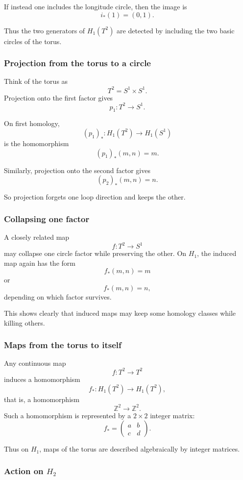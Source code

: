 \documentclass[12pt,a4paper]{article}
\theoremstyle{notespace}
\begin{document}
If instead one includes the longitude circle, then the image is
\[
i_*(1)=(0,1).
\]

Thus the two generators of \(H_1(T^2)\) are detected by including the two basic circles of the torus.

\subsubsection{Projection from the torus to a circle}

Think of the torus as
\[
T^2=S^1\times S^1.
\]
Projection onto the first factor gives
\[
p_1:T^2\to S^1.
\]

On first homology,
\[
(p_1)_*:H_1(T^2)\to H_1(S^1)
\]
is the homomorphism
\[
(p_1)_*(m,n)=m.
\]

Similarly, projection onto the second factor gives
\[
(p_2)_*(m,n)=n.
\]

So projection forgets one loop direction and keeps the other.

\subsubsection{Collapsing one factor}

A closely related map
\[
f:T^2\to S^1
\]
may collapse one circle factor while preserving the other. On \(H_1\), the induced map again has the form
\[
f_*(m,n)=m
\]
or
\[
f_*(m,n)=n,
\]
depending on which factor survives.

This shows clearly that induced maps may keep some homology classes while killing others.

\subsubsection{Maps from the torus to itself}

Any continuous map
\[
f:T^2\to T^2
\]
induces a homomorphism
\[
f_*:H_1(T^2)\to H_1(T^2),
\]
that is, a homomorphism
\[
\mathbb{Z}^2\to \mathbb{Z}^2.
\]
Such a homomorphism is represented by a \(2\times 2\) integer matrix:
\[
f_*=
\begin{pmatrix}
	a & b\\
	c & d
\end{pmatrix}.
\]

Thus on \(H_1\), maps of the torus are described algebraically by integer matrices.

\subsubsection{Action on \texorpdfstring{$H_2$}{H2}}
\end{document}
